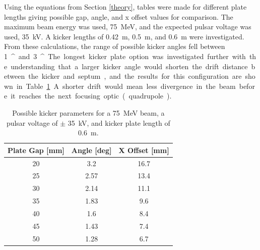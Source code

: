 Using the equations from Section \ref{theory}, 
tables were made for different plate lengths giving possible gap, angle, and x offset values for comparison. 
The maximum beam energy was used, \SI{75}{MeV}, and the expected pulsar voltage was used, \SI{35}{kV}.
A kicker lengths of \SI{0.42}{m}, \SI{0.5}{m}, and \SI{0.6}{m} were investigated.
From these calculations, the range of possible kicker angles fell between \SI{1}{^\circ} and \SI{3}{^\circ}.
The longest kicker plate option was investigated further with the understanding that 
a larger kicker angle would shorten the drift distance between the kicker and septum, 
and the results for this configuration are shown in Table \ref{tab:kickparam}.
A shorter drift would mean less divergence in the beam before it reaches the next focusing optic (quadrupole).
\begin{table}%
	\begin{center}
		\caption{Possible kicker parameters for a \SI{75}{MeV} beam,  
		a pulsar voltage of $\pm$ \SI{35}{kV}, 
		and kicker plate length of \SI{0.6}{m}.}\label{tab:kickparam}
	\begin{tabular}{|ccc|}
		\rowcolor{blue!30} 
		\textbf{Plate Gap [mm]} & \textbf{Angle [deg]}  & \textbf{X Offset [mm]} \\ \hline
		20 & 3.2   & 16.7    \\ %
		25 & 2.57  & 13.4  \\ %
		30 & 2.14  & 11.1 \\		 
		35 & 1.83  & 9.6	  \\
		40 & 1.6   & 8.4		 \\
		45 & 1.43  & 7.4      \\
		50 & 1.28  & 6.7   \\ \hline
	\end{tabular}	
	\end{center}
\end{table}


